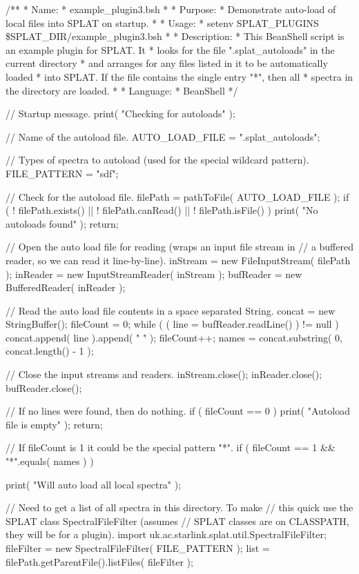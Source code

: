 \documentclass[twoside,11pt,nolof]{starlink}
\providecommand{\exampleheading}[1]
{\begin{center}
  \fbox{#1}
 \end{center}
}
\begin{document}
\exampleheading{Example spectral auto-loading}

\begin{terminalv}
/**
 * Name:
 *    example_plugin3.bsh
 *
 * Purpose:
 *    Demonstrate auto-load of local files into SPLAT on startup.
 *
 * Usage:
 *    setenv SPLAT_PLUGINS \$SPLAT_DIR/example_plugin3.bsh
 *
 * Description:
 *    This BeanShell script is an example plugin for SPLAT. It
 *    looks for the file ".splat_autoloads" in the current directory
 *    and arranges for any files listed in it to be automatically loaded
 *    into SPLAT. If the file contains the single entry "*", then all
 *    spectra in the directory are loaded.
 *
 * Language:
 *    BeanShell
 */

// Startup message.
print( "Checking for autoloads" );

// Name of the autoload file.
AUTO_LOAD_FILE = ".splat_autoloads";

// Types of spectra to autoload (used for the special wildcard pattern).
FILE_PATTERN = "sdf";

// Check for the autoload file.
filePath = pathToFile( AUTO_LOAD_FILE );
if ( ! filePath.exists() || ! filePath.canRead() || ! filePath.isFile() ) {
    print( "No autoloads found" );
    return;
}

// Open the auto load file for reading (wraps an input file stream in
// a buffered reader, so we can read it line-by-line).
inStream = new FileInputStream( filePath );
inReader = new InputStreamReader( inStream );
bufReader = new BufferedReader( inReader );

// Read the auto load file contents in a space separated String.
concat = new StringBuffer();
fileCount = 0;
while ( ( line = bufReader.readLine() ) != null ) {
   concat.append( line ).append( " " );
   fileCount++;
}
names = concat.substring( 0, concat.length() - 1 );

// Close the input streams and readers.
inStream.close();
inReader.close();
bufReader.close();

// If no lines were found, then do nothing.
if ( fileCount == 0 ) {
    print( "Autoload file is empty" );
    return;
}

// If fileCount is 1 it could be the special pattern "*".
if ( fileCount == 1 && "*".equals( names ) ) {
    print( "Will auto load all local spectra" );

    // Need to get a list of all spectra in this directory. To make
    // this quick use the SPLAT class SpectralFileFilter (assumes
    // SPLAT classes are on CLASSPATH, they will be for a plugin).
    import uk.ac.starlink.splat.util.SpectralFileFilter;
    fileFilter = new SpectralFileFilter( FILE_PATTERN );
    list = filePath.getParentFile().listFiles( fileFilter );

}
\end{terminalv}
\end{document}
